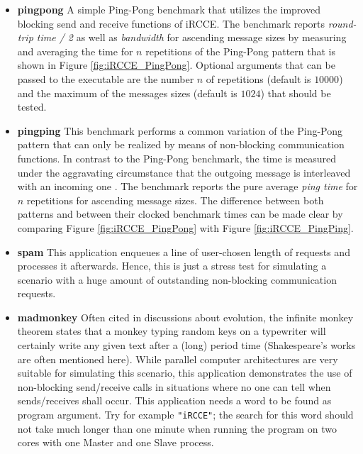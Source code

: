 \documentclass[fontsize=10pt, paper=a4, DIV12, pagesize=auto]{scrartcl}
\begin{document}
\begin{itemize}

	\item {\sffamily\normalsize\textbf{pingpong}}
	A simple Ping-Pong benchmark that utilizes the improved blocking send and receive functions of iRCCE.
The benchmark reports \emph{round-trip time / 2} as well as \emph{bandwidth} for ascending message sizes by measuring and averaging the time for $n$ repetitions of the Ping-Pong pattern that is shown in Figure \ref{fig:iRCCE_PingPong}.
Optional arguments that can be passed to the executable are the number $n$ of repetitions (default is $10000$) and the maximum of the messages sizes (default is $1024$) that should be tested.

	\item {\sffamily\normalsize\textbf{pingping}}
	This benchmark performs a common variation of the Ping-Pong pattern that can only be realized by means of non-blocking communication functions.
In contrast to the Ping-Pong benchmark, the time is measured under the aggravating circumstance that the outgoing message is interleaved with an incoming one \cite{IMB}.
The benchmark reports the pure average \emph{ping time} for $n$ repetitions for ascending message sizes.
The difference between both patterns and between their clocked benchmark times can be made clear by comparing Figure \ref{fig:iRCCE_PingPong} with Figure \ref{fig:iRCCE_PingPing}.

	\item {\sffamily\normalsize\textbf{spam}}
	This application enqueues a line of user-chosen length of requests and processes it afterwards.
Hence, this is just a stress test for simulating a scenario with a huge amount of outstanding non-blocking communication requests.

	\item {\sffamily\normalsize\textbf{madmonkey}}
	Often cited in discussions about evolution, the infinite monkey theorem states that a monkey typing random keys on a typewriter will certainly write any given text after a (long) period time (Shakespeare's works are often mentioned here).
While parallel computer architectures are very suitable for simulating this scenario, this application demonstrates the use of non-blocking send/receive calls in situations where no one can tell when sends/receives shall occur. 
This application needs a word to be found as program argument. Try for example \texttt{"iRCCE"}; the search for this word should not take much longer than one minute when running the program on two cores with one Master and one Slave process.

\end{itemize}
\enlargethispage{0.5cm}
\end{document}
